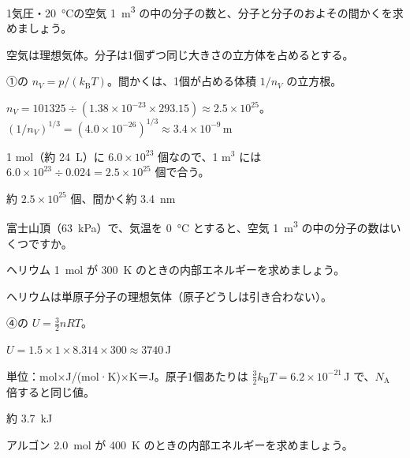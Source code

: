 \begin{reidai}[1 m$^3$ の中の分子の数]
\label{ph:熱-14:ex2}1気圧・\qty{20}{\celsius}の空気 \qty{1}{m^3} の中の分子の数と、分子と分子のおよその間かくを求めましょう。
\par{} 空気は理想気体。分子は1個ずつ同じ大きさの立方体を占めるとする。
\par\kangaekata ①の $n_V=p/(k_{\mathrm B}T)$。間かくは、1個が占める体積 $1/n_V$ の立方根。
\par\shiki $n_V=\num{101325}\div(1.38\times10^{-23}\times293.15)\approx2.5\times10^{25}$。$(1/n_V)^{1/3}=(4.0\times10^{-26})^{1/3}\approx3.4\times10^{-9}$\,m
\par{} 1 mol（約 \qty{24}{L}）に $6.0\times10^{23}$ 個なので、1 m$^3$ には $6.0\times10^{23}\div0.024=2.5\times10^{25}$ 個で合う。
\par\kotae 約 $2.5\times10^{25}$ 個、間かく約 \qty{3.4}{nm}
\end{reidai}
\begin{jibun}
富士山頂（\qty{63}{kPa}）で、気温を \qty{0}{\celsius} とすると、空気 \qty{1}{m^3} の中の分子の数はいくつですか。
\end{jibun}

\begin{reidai}[ヘリウムの内部エネルギー]
\label{ph:熱-14:ex3}ヘリウム \qty{1}{mol} が \qty{300}{K} のときの内部エネルギーを求めましょう。
\par{} ヘリウムは単原子分子の理想気体（原子どうしは引き合わない）。
\par\kangaekata ④の $U=\tfrac32nRT$。
\par\shiki $U=1.5\times1\times8.314\times300\approx\num{3740}$\,J
\par{} 単位：mol×J/(mol·K)×K＝J。原子1個あたりは $\tfrac32k_{\mathrm B}T=6.2\times10^{-21}$\,J で、$N_{\mathrm A}$ 倍すると同じ値。
\par\kotae 約 \qty{3.7}{kJ}
\end{reidai}
\begin{jibun}
アルゴン \qty{2.0}{mol} が \qty{400}{K} のときの内部エネルギーを求めましょう。
\end{jibun}

